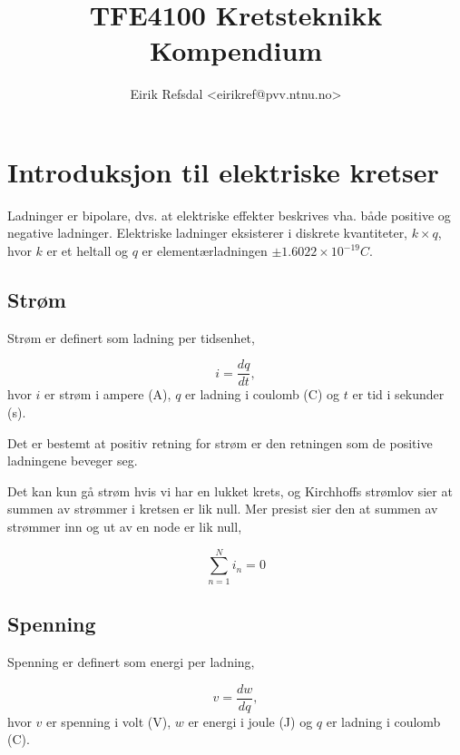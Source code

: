 \documentclass[norsk, a4paper, 12pt, twoside, titlepage]{article}
\title{TFE4100 Kretsteknikk\\Kompendium}
\author{Eirik Refsdal <eirikref@pvv.ntnu.no>}
\begin{document}
\maketitle

\tableofcontents

\newpage

\section{Introduksjon til elektriske kretser}
Ladninger er bipolare, dvs. at elektriske effekter beskrives vha. både
positive og negative ladninger.  Elektriske ladninger eksisterer i
diskrete kvantiteter, $k \times q$, hvor $k$ er et heltall og $q$ er
elementærladningen $\pm1.6022 \times 10^{-19} C$.

\subsection{Strøm}
Strøm er definert som ladning per tidsenhet,

\begin{equation}
i = \frac{dq}{dt},
\end{equation}
hvor $i$ er strøm i ampere (A), $q$ er ladning i coulomb (C) og $t$ er
tid i sekunder (s).

Det er bestemt at positiv retning for strøm er den retningen som de
positive ladningene beveger seg.

Det kan kun gå strøm hvis vi har en lukket krets, og Kirchhoffs
strømlov sier at summen av strømmer i kretsen er lik null.  Mer
presist sier den at summen av strømmer inn og ut av en node er lik
null,

\begin{equation}
\sum_{n=1}^{N}i_{n} = 0
\end{equation}



\subsection{Spenning}
\label{Spenning}
Spenning er definert som energi per ladning,

\begin{equation}
v = \frac{dw}{dq},
\end{equation}
hvor $v$ er spenning i volt (V), $w$ er energi i joule (J) og $q$ er
ladning i coulomb (C).
\end{document}
